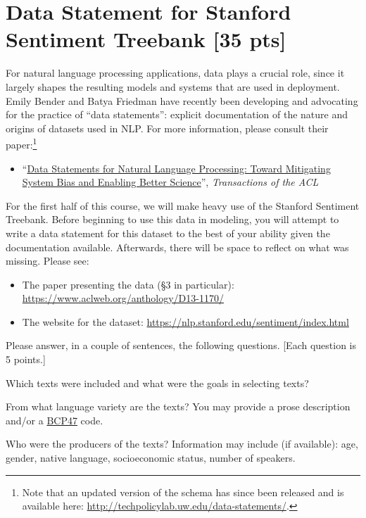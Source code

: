 \documentclass[11pt]{article}
\begin{document}
\section{Data Statement for Stanford Sentiment Treebank [35 pts]}

For natural language processing applications, data plays a crucial role, since it largely shapes the resulting models and systems that are used in deployment.  Emily Bender and Batya Friedman have recently been developing and advocating for the practice of ``data statements'': explicit documentation of the nature and origins of datasets used in NLP.  For more information, please consult their paper:\footnote{Note that an updated version of the schema has since been released and is available here: \url{http://techpolicylab.uw.edu/data-statements/}.}
\begin{itemize}
  \item ``\href{https://www.aclweb.org/anthology/Q18-1041/}{Data Statements for Natural Language Processing: Toward Mitigating System Bias and Enabling Better Science}'', \emph{Transactions of the ACL}
\end{itemize}
For the first half of this course, we will make heavy use of the Stanford Sentiment Treebank.  Before beginning to use this data in modeling, you will attempt to write a data statement for this dataset to the best of your ability given the documentation available.  Afterwards, there will be space to reflect on what was missing. Please see:
\begin{itemize}
  \item The paper presenting the data (\S3 in particular): \url{https://www.aclweb.org/anthology/D13-1170/}
  \item The website for the dataset: \url{https://nlp.stanford.edu/sentiment/index.html}
\end{itemize}
Please answer, in a couple of sentences, the following questions. [Each question is 5 points.]

\vspace{2em}
 Which texts were included  and  what  were  the  goals  in  selecting texts?

\vspace{2em}
 From what language variety are the texts?  You may provide a prose description and/or a \href{https://tools.ietf.org/rfc/bcp/bcp47.txt}{BCP47} code.

\vspace{2em}
 Who were the producers of the texts?  Information may include (if available): age, gender, native language, socioeconomic status, number of speakers.
\end{document}
